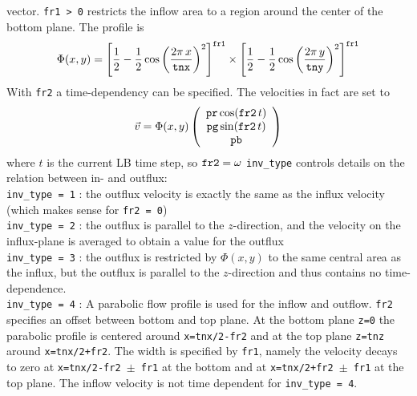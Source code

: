\documentclass[a4paper]{article}
\begin{document}
\begin{description}
           vector. {\tt fr1 > 0} restricts the inflow area to a region around the 
           center of the bottom plane. The profile is 
           \[
              \Phi (x, y) = \left[
               \frac{1}{2}-\frac{1}{2} \cos \left( \frac{2\pi\,x}{\tt tnx} \right)^2
              \right]^{\tt fr1}\times\left[
               \frac{1}{2}-\frac{1}{2} \cos \left( \frac{2\pi\,y}{\tt tny} \right)^2
              \right]^{\tt fr1}
           \]
           With {\tt fr2} a time-dependency can be specified. The velocities in fact
           are set to 
           \[
              \vec{v} = \Phi (x, y) \left( \begin{array}{ccc}
                     {\tt pr}\cos({\tt fr2}\,t)\\
                     {\tt pg}\sin({\tt fr2}\,t)\\
                     {\tt pb}
                   \end{array}\right)
           \]
           where $t$ is the current LB time step, so ${\tt fr2} = \omega$
           {\tt inv\_type} controls details on the relation between in- and outflux:\\
           {\tt inv\_type = 1} : the outflux velocity is exactly the same as the influx 
                     velocity (which makes sense for {\tt fr2 = 0})\\
           {\tt inv\_type = 2} : the outflux is parallel to the $z$-direction, and the 
                         velocity on the influx-plane is averaged to obtain a value for 
                         the outflux\\
           {\tt inv\_type = 3} : the outflux is restricted by $\Phi(x, y)$ to the same
                         central area as the influx, but the outflux is parallel to 
                         the $z$-direction and thus contains no time-dependence.\\
           {\tt inv\_type = 4} : A parabolic flow profile is used for the inflow 
                         and outflow. {\tt fr2} specifies an offset between bottom
                         and top plane. At the bottom plane {\tt z=0} the parabolic 
                         profile is centered around {\tt x=tnx/2-fr2} and at the top 
                         plane {\tt z=tnz} around {\tt x=tnx/2+fr2}. The width is
                         specified by {\tt fr1}, namely the velocity decays to zero
                         at {\tt x=tnx/2-fr2 $\pm$ fr1} at the bottom and at 
                         {\tt x=tnx/2+fr2 $\pm$ fr1} at the top plane. The inflow 
                         velocity is not time dependent for {\tt inv\_type = 4}.\\

\end{description}
\end{document}
